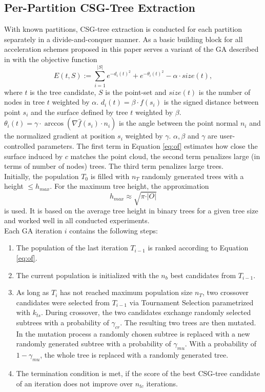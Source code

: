 \subsection{Per-Partition \ac{CSG}-Tree Extraction}
\label{ch:ga}
With known partitions, \ac{CSG}-tree extraction is conducted for each partition separately in a divide-and-conquer manner.
As a basic building block for all acceleration schemes proposed in this paper serves a variant of the \ac{GA} described in \cite{fayolle2016evolutionary} with the objective function
\begin{equation}
\label{eq:of}
E(t, S) := \sum_{i=1}^{|S|}{e^{-d_i(t)^2}+e^{-\theta_i(t)^2}}-\alpha \cdot size(t),
\end{equation}
where $t$ is the tree candidate, $S$ is the point-set and $size(t)$ is the number of nodes in tree $t$ weighted by $\alpha$.
$d_i(t) = \beta \cdot f(s_i)$ is the signed distance between point $s_i$ and the surface defined by tree $t$ weighted by $\beta$.
$\theta_i(t) = \gamma \cdot  \arccos(\nabla \hat{f}(s_i) \cdot n_i)$ is the angle between the point normal $n_i$ and the normalized gradient at position $s_i$ weighted by $\gamma$.  
$\alpha, \beta$ and $\gamma$ are user-controlled parameters. 
The first term in Equation \ref{eq:of} estimates how close the surface induced by $c$ matches the point cloud, the second term penalizes large (in terms of number of nodes) trees.
The third term penalizes large trees.
\\
Initially, the population $T_0$ is filled with $n_T$ randomly generated trees with a height $\le h_{max}$. 
For the maximum tree height, the approximation  
\begin{equation}
h_{max}\approx \sqrt{\pi \cdot \vert O \vert}
\end{equation}
is used. 
It is based on the average tree height in binary trees for a given tree size \cite{flajolet1982TheAH} and worked well in all conducted experiments. 
\\
Each \ac{GA} iteration $i$ contains the following steps:
\begin{enumerate}
\item The population of the last iteration $T_{i-1}$ is ranked according to Equation \ref{eq:of}.
\item The current population is initialized with the $n_b$ best candidates from $T_{i-1}$.
\item As long as $T_i$ has not reached maximum population size $n_T$, two crossover candidates were selected from $T_{i-1}$ via Tournament Selection \cite{miller95genetic} parametrized with $k_{ts}$.
During crossover, the two candidates exchange randomly selected subtrees with a probability of $\gamma_{cr}$.
The resulting two trees are then mutated. 
In the mutation process a randomly chosen subtree is replaced with a new randomly generated subtree with a probability of $\gamma_{mu}$.
With a probability of $1-\gamma_{mu}$, the whole tree is replaced with a randomly generated tree.
\item The termination condition is met, if the score of the best \ac{CSG}-tree candidate of an iteration does not improve over $n_{tc}$ iterations.  	 
\end{enumerate}  
